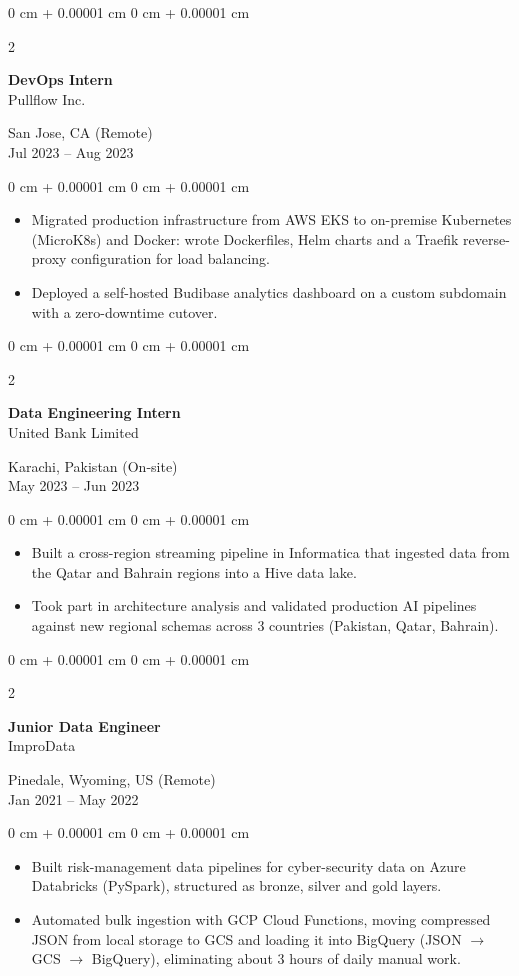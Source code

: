 \documentclass[10pt, letterpaper]{article}
\newenvironment{highlights}{
    \begin{itemize}[
        topsep=0.10 cm,
        parsep=0.10 cm,
        partopsep=0pt,
        itemsep=0pt,
        leftmargin=0 cm + 10pt
    ]
}{
    \end{itemize}
} %
\newenvironment{onecolentry}{
    \begin{adjustwidth}{
        0 cm + 0.00001 cm
    }{
        0 cm + 0.00001 cm
    }
}{
    \end{adjustwidth}
} %
\newenvironment{twocolentry}[2][]{
    \onecolentry
    \def\secondColumn{#2}
    \setcolumnwidth{\fill, 4.5 cm}
    \begin{paracol}{2}
}{
    \switchcolumn \raggedleft \secondColumn
    \end{paracol}
    \endonecolentry
} %
\begin{document}
\vspace{0.2 cm}

\begin{twocolentry}{San Jose, CA (Remote) \\ Jul 2023 -- Aug 2023}
    \textbf{DevOps Intern} \\
    Pullflow Inc.
\end{twocolentry}
\begin{onecolentry}
    \begin{highlights}
        \item Migrated production infrastructure from AWS EKS to on-premise Kubernetes (MicroK8s) and Docker: wrote Dockerfiles, Helm charts and a Traefik reverse-proxy configuration for load balancing.
        \item Deployed a self-hosted Budibase analytics dashboard on a custom subdomain with a zero-downtime cutover.
    \end{highlights}
\end{onecolentry}

\vspace{0.2 cm}

\begin{twocolentry}{Karachi, Pakistan (On-site) \\ May 2023 -- Jun 2023}
    \textbf{Data Engineering Intern} \\
    United Bank Limited
\end{twocolentry}
\begin{onecolentry}
    \begin{highlights}
        \item Built a cross-region streaming pipeline in Informatica that ingested data from the Qatar and Bahrain regions into a Hive data lake.
        \item Took part in architecture analysis and validated production AI pipelines against new regional schemas across 3 countries (Pakistan, Qatar, Bahrain).
    \end{highlights}
\end{onecolentry}

\vspace{0.2 cm}

\begin{twocolentry}{Pinedale, Wyoming, US (Remote) \\ Jan 2021 -- May 2022}
    \textbf{Junior Data Engineer} \\
    ImproData
\end{twocolentry}
\begin{onecolentry}
    \begin{highlights}
        \item Built risk-management data pipelines for cyber-security data on Azure Databricks (PySpark), structured as bronze, silver and gold layers.
        \item Automated bulk ingestion with GCP Cloud Functions, moving compressed JSON from local storage to GCS and loading it into BigQuery (JSON $\rightarrow$ GCS $\rightarrow$ BigQuery), eliminating about 3 hours of daily manual work.
    \end{highlights}
\end{onecolentry}
\end{document}
